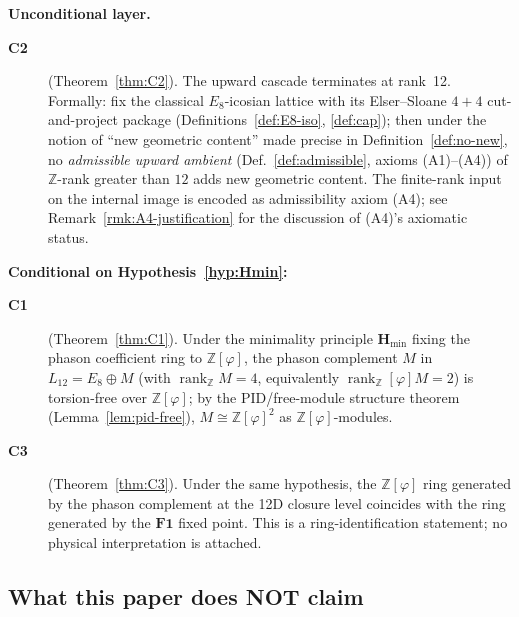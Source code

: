 \documentclass[11pt, a4paper]{amsart}
\theoremstyle{definition}
\newcommand{\Z}{\mathbb{Z}}
\newcommand{\rk}{\operatorname{rank}}
\newcommand{\Hmin}{\mathbf{H}_{\min}}
\newcommand{\Ophi}{\mathbb{Z}[\varphi]}
\begin{document}
\textbf{Unconditional layer.}
\begin{description}
\item[\textbf{C2}] (Theorem~\ref{thm:C2}). The upward cascade
  terminates at rank~12. Formally: fix the classical
  $E_8$-icosian lattice with its Elser--Sloane $4+4$
  cut-and-project package
  (Definitions~\ref{def:E8-iso}, \ref{def:cap}); then under
  the notion of ``new geometric content'' made precise in
  Definition~\ref{def:no-new}, no \emph{admissible upward
  ambient} (Def.~\ref{def:admissible}, axioms (A1)--(A4)) of
  $\Z$-rank greater than $12$ adds new geometric content. The
  finite-rank input on the internal image is encoded as
  admissibility axiom (A4); see Remark~\ref{rmk:A4-justification}
  for the discussion of (A4)'s axiomatic status.
\end{description}

\textbf{Conditional on Hypothesis~\ref{hyp:Hmin}:}
\begin{description}
\item[\textbf{C1}] (Theorem~\ref{thm:C1}). Under the minimality
  principle $\Hmin$ fixing the phason coefficient ring to
  $\Ophi$, the phason complement $M$ in $L_{12} = E_8 \oplus M$
  (with $\rk_\Z M = 4$, equivalently $\rk_\Ophi M = 2$) is
  torsion-free over $\Ophi$; by the PID/free-module structure
  theorem (Lemma~\ref{lem:pid-free}), $M \cong \Ophi^{2}$ as
  $\Ophi$-modules.
\item[\textbf{C3}] (Theorem~\ref{thm:C3}). Under the same
  hypothesis, the $\Ophi$ ring generated by the phason
  complement at the 12D closure level coincides with the ring
  generated by the $\mathbf{F1}$ fixed point. This is a
  ring-identification statement; no physical interpretation is
  attached.
\end{description}

\subsection{What this paper does NOT claim}
\end{document}
